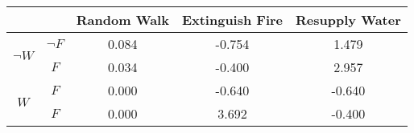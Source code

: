 \begin{center}
\begin{tabular}{|c|c|c|c|c|}
  \hline
  &   & Random Walk & Extinguish Fire & Resupply Water\\
  \hline
  \multirow{2}{*}{$\neg W$} & $\neg F$ & 0.084 & -0.754 & 1.479\\
  \cline{2-5}
   & $F$ & 0.034 & -0.400 & 2.957\\
  \hline
  \multirow{2}{*}{$W$} & $F$ & 0.000 & -0.640 & -0.640\\
  \cline{2-5}
   & $F$ & 0.000 & 3.692 & -0.400\\
  \hline
\end{tabular}
\end{center}

